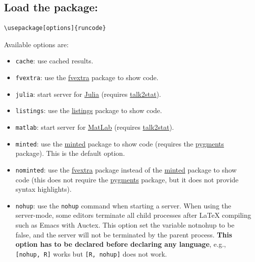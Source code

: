 \documentclass{ltxdoc}
\begin{document}
\subsection{Load the package:}
\label{sec:orge3286de}
\begin{verbatim}
\usepackage[options]{runcode}
\end{verbatim}

Available options are:

\begin{itemize}
\item \texttt{cache}: use cached results.

\item \texttt{fvextra}: use the \href{https://ctan.org/pkg/fvextra}{fvextra} package to show code.

\item \texttt{julia}: start server for \href{https://julialang.org/}{Julia} (requires \href{https://pypi.org/project/talk2stat/}{talk2stat}).

\item \texttt{listings}: use the \href{https://ctan.org/pkg/listings?lang=en}{listings} package to show code.

\item \texttt{matlab}: start server for \href{https://www.mathworks.com/products/matlab.html}{MatLab} (requires \href{https://pypi.org/project/talk2stat/}{talk2stat}).

\item \texttt{minted}: use the \href{https://ctan.org/pkg/minted}{minted} package to show code (requires the \href{https://pygments.org/}{pygments} package).
This is the default option.

\item \texttt{nominted}: use the \href{https://ctan.org/pkg/fvextra}{fvextra} package
instead of the \href{https://ctan.org/pkg/minted}{minted} package to show
code (this does not require the \href{https://pygments.org/}{pygments}
package, but it does not provide syntax highlights).

\item \texttt{nohup}: use the \texttt{nohup} command when starting a server. When using
the server-mode, some editors terminate all child processes after
\LaTeX{} compiling such as Emacs with Auctex. This option set the
variable notnohup to be false, and the server will not be terminated
by the parent process. \textbf{This option has to be declared before
declaring any language}, e.g., \texttt{[nohup, R]} works but \texttt{[R, nohup]}
does not work.


\end{itemize}
\end{document}
